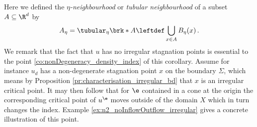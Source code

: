Here we defined the \emph{$\eta$-neighbourhood} or \emph{tubular neighbourhood}
of a subset $A\subseteq\R^d$ by
\begin{align}
  A_\eta=\tubular_\eta\brk*{A}\leftdef\bigcup_{x\in A}B_\eta(x)\label{eq:def_tubularNbh}\,.
\end{align}
We remark that the fact that $u$ has no irregular stagnation points is essential to the point 
\ref{co:nonDegeneracy_density_index} of this corollary. 
Assume for instance $u_d$ has a non-degenerate stagnation point $x$ on the boundary $\Sigma$, 
which means by Proposition \ref{pr:characterisation_irregular_bd} that $x$ is an irregular critical point. 
It may then follow that for $\e$ contained in a cone 
at the origin the corresponding critical point of
$u^\e$ moves outside of the domain $X$ which in turn changes the index.
Example \ref{ex:n2_noInflowOutflow_irregular} gives a concrete illustration of this point.
